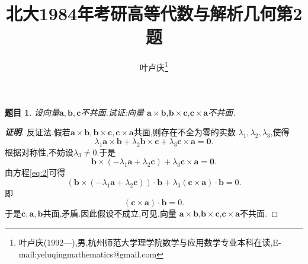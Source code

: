 \documentclass[a4paper]{article}
\newtheorem*{exe}{题目}
\newenvironment{exercise}
{\bigskip\begin{mdframed}\begin{exe}}
    {\end{exe}\end{mdframed}\bigskip}
\begin{document}
\title{\huge{\bf{北大1984年考研高等代数与解析几何第2题}}} \author{\small{叶卢庆\footnote{叶卢庆(1992---),男,杭州师范大学理学院数学与应用数学专业本科在读,E-mail:yeluqingmathematics@gmail.com}}}
\maketitle
\begin{exercise}
  设向量$\mathbf{a},\mathbf{b},\mathbf{c}$不共面.试证:向量
  $\mathbf{a}\times \mathbf{b}$,$\mathbf{b}\times
  \mathbf{c}$,$\mathbf{c}\times \mathbf{a}$不共面.
\end{exercise}
\begin{proof}[\textbf{证明}]
反证法.假若$\mathbf{a}\times \mathbf{b},\mathbf{b}\times
\mathbf{c},\mathbf{c}\times \mathbf{a}$共面,则存在不全为零的实数
$\lambda_1,\lambda_2,\lambda_3$,使得
\begin{equation}
  \label{eq:1}
  \lambda_1\mathbf{a}\times \mathbf{b}+\lambda_2\mathbf{b}\times
  \mathbf{c}+\lambda_3\mathbf{c}\times \mathbf{a}=\mathbf{0}.
\end{equation}
根据对称性,不妨设$\lambda_3\neq 0$.于是
\begin{equation}
  \label{eq:2}
  \mathbf{b}\times(-\lambda_1\mathbf{a}+\lambda_2\mathbf{c})+\lambda_3\mathbf{c}\times \mathbf{a}=\mathbf{0}.
\end{equation}
由方程\eqref{eq:2}可得
\begin{equation}
  \label{eq:3}
  (\mathbf{b}\times(-\lambda_1\mathbf{a}+\lambda_2\mathbf{c}))\cdot
  \mathbf{b}+\lambda_3(\mathbf{c}\times \mathbf{a})\cdot \mathbf{b}=0.
\end{equation}
即
\begin{equation}
  \label{eq:4}
  (\mathbf{c}\times \mathbf{a})\cdot \mathbf{b}=0.
\end{equation}
于是$\mathbf{c},\mathbf{a},\mathbf{b}$共面,矛盾.因此假设不成立,可见,向量
  $\mathbf{a}\times \mathbf{b}$,$\mathbf{b}\times
  \mathbf{c}$,$\mathbf{c}\times \mathbf{a}$不共面.
\end{proof}
\end{document}
